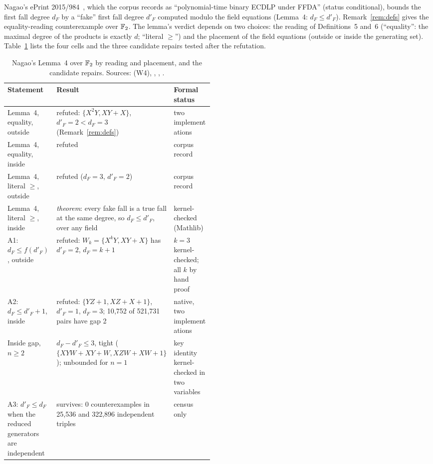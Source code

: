 Nagao's ePrint 2015/984~\cite{nagao2015}, which the corpus records as
``polynomial-time binary ECDLP under FFDA'' (status conditional), bounds the
first fall degree $d_F$ by a ``fake'' first fall degree $d'_F$ computed
modulo the field equations (Lemma~4: $d_F\le d'_F$). Remark~\ref{rem:defs}
gives the equality-reading counterexample over $\mathbb{F}_2$. The lemma's verdict
depends on two choices: the reading of Definitions~5 and~6 (``equality'':
the maximal degree of the products is exactly $d$; ``literal $\ge$'') and
the placement of the field equations (outside or inside the generating set).
Table~\ref{tab:hd-nagao} lists the four cells and the three candidate repairs
tested after the refutation.

\begin{table}[tbp]
\centering\small
\begin{tabularx}{\linewidth}{@{}>{\raggedright\arraybackslash}p{0.24\linewidth}>{\raggedright\arraybackslash}X>{\raggedright\arraybackslash}p{0.24\linewidth}@{}}
\toprule
Statement & Result & Formal status \\
\midrule
Lemma~4, equality, outside & refuted: $\{X^2Y,XY+X\}$, $d'_F=2<d_F=3$ (Remark~\ref{rem:defs}) & two implementations \\
Lemma~4, equality, inside & refuted & corpus record \\
Lemma~4, literal $\ge$, outside & refuted ($d_F=3$, $d'_F=2$) & corpus record \\
Lemma~4, literal $\ge$, inside & \emph{theorem}: every fake fall is a true fall at the same degree, so $d_F\le d'_F$, over any field & kernel-checked (Mathlib) \\
\addlinespace
A1: $d_F\le f(d'_F)$, outside & refuted: $W_k=\{X^kY,XY+X\}$ has $d'_F=2$, $d_F=k+1$ & $k=3$ kernel-checked; all $k$ by hand proof \\
A2: $d_F\le d'_F+1$, inside & refuted: $\{YZ+1,XZ+X+1\}$, $d'_F=1$, $d_F=3$; 10{,}752 of 521{,}731 pairs have gap 2 & native, two implementations \\
Inside gap, $n\ge2$ & $d_F-d'_F\le3$, tight ($\{XYW+XY+W,XZW+XW+1\}$); unbounded for $n=1$ & key identity kernel-checked in two variables \\
A3: $d'_F\le d_F$ when the reduced generators are independent & survives: 0 counterexamples in 25{,}536 and 322{,}896 independent triples & census only \\
\bottomrule
\end{tabularx}
\caption[]{Nagao's Lemma~4 over $\mathbb{F}_2$ by reading and placement, and the
candidate repairs. Sources:
 (W4),
,
,
.}
\label{tab:hd-nagao}
\end{table}

